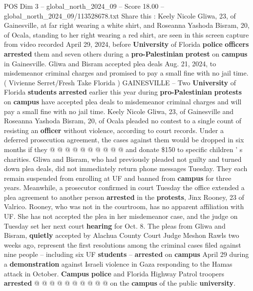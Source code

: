 \begin{textsample}{POS Dim 3 – global\_north\_2024\_09 – Score 18.00 – global\_north\_2024\_09/113528678.txt}  \label{ex:f3_pos_167}
Share this : Keely Nicole Gliwa, 23, of Gainesville, at far right wearing a white shirt, and Roseanna Yashoda Bisram, 20, of Ocala, standing to her right wearing a red shirt, are seen in this screen capture from video recorded April 29, 2024, before \textbf{University} of Florida \textbf{police} \textbf{officers} \textbf{arrested} them and seven others during a \textbf{pro-Palestinian} \textbf{protest} on \textbf{campus} in Gainesville.
Gliwa and Bisram accepted plea deals Aug. 21, 2024, to misdemeanor criminal charges and promised to pay a small fine with no jail time. ( Vivienne Serret/Fresh Take Florida ) GAINESVILLE -- Two \textbf{University} of Florida \textbf{students} \textbf{arrested} earlier this year during \textbf{pro-Palestinian} \textbf{protests} on \textbf{campus} have accepted plea deals to misdemeanor criminal charges and will pay a small fine with no jail time.
Keely Nicole Gliwa, 23, of Gainesville and Roseanna Yashoda Bisram, 20, of Ocala pleaded no contest to a single count of resisting an \textbf{officer} without violence, according to court records.
Under a deferred prosecution agreement, the cases against them would be dropped in six months if they @ @ @ @ @ @ @ @ @ @ and donate \$150 to specific children ' s charities.
Gliwa and Bisram, who had previously pleaded not guilty and turned down plea deals, did not immediately return phone messages Tuesday.
They each remain suspended from enrolling at UF and banned from \textbf{campus} for three years.
Meanwhile, a prosecutor confirmed in court Tuesday the office extended a plea agreement to another person \textbf{arrested} in the \textbf{protests}, Jinx Rooney, 23 of Valrico.
Rooney, who was not in the courtroom, has no apparent affiliation with UF.
She has not accepted the plea in her misdemeanor case, and the judge on Tuesday set her next court \textbf{hearing} for Oct. 8.
The pleas from Gliwa and Bisram, \textbf{quietly} accepted by Alachua County Court Judge Meshon Rawls two weeks ago, represent the first resolutions among the criminal cases filed against nine people -- including six UF \textbf{students} -- \textbf{arrested} on \textbf{campus} April 29 during a \textbf{demonstration} against Israeli violence in Gaza responding to the Hamas attack in October. \textbf{Campus} \textbf{police} and Florida Highway Patrol troopers \textbf{arrested} @ @ @ @ @ @ @ @ @ @ on the \textbf{campus} of the public \textbf{university}.

\end{textsample}
